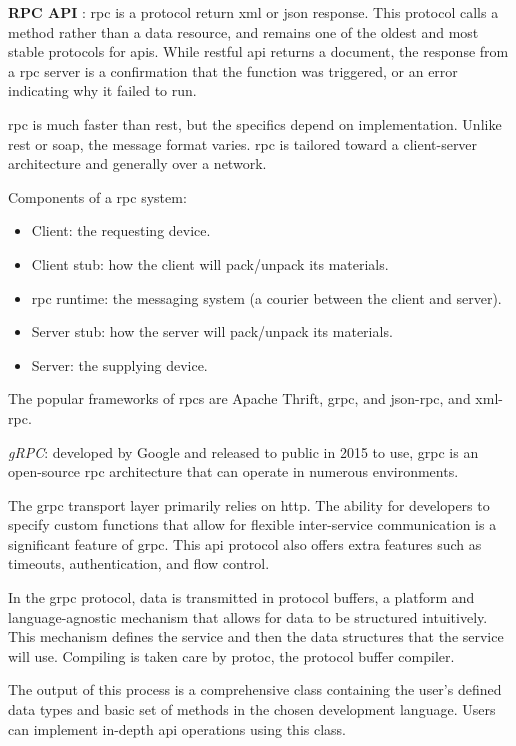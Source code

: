 \begin{multicols}{2} %
    \textbf{RPC API} : \acrshort{rpc} is a protocol return \acrshort{xml} or \acrshort{json} response. This protocol
    calls a method rather than a data resource, and remains one of the oldest and most stable protocols for
    \acrshort{api}s. While \acrshort{rest}ful \acrshort{api} returns a document, the response from a \acrshort{rpc}
    server is a confirmation that the function was triggered, or an error indicating  why it failed to run.

    \acrshort{rpc} is much faster than \acrshort{rest}, but the specifics depend on implementation. Unlike
    \acrshort{rest} or \acrshort{soap}, the message format varies. \acrshort{rpc} is tailored toward a client-server
    architecture and generally over a network.

    Components of a \acrshort{rpc} system:
    \begin{itemize}[label=$\star$]
        \item Client: the requesting device.
        \item Client stub: how the client will pack/unpack its materials.
        \item \acrshort{rpc} runtime: the messaging system (a courier between the client and server).
        \item Server stub: how the server will pack/unpack its materials.
        \item Server: the supplying device.
    \end{itemize}

    The popular frameworks of \acrshort{rpc}s are Apache Thrift, \acrshort{grpc}, and \acrshort{json}-\acrshort{rpc},
    and \acrshort{xml}-\acrshort{rpc}.

    \textit{gRPC}: developed by Google and released to public in 2015 to use, \acrshort{grpc} is an open-source
    \acrshort{rpc} architecture that can operate in numerous environments.

    The \acrshort{grpc} transport layer primarily relies on \acrshort{http}. The ability for developers to specify
    custom functions that allow for flexible inter-service communication is a significant feature of \acrshort{grpc}.
    This \acrshort{api} protocol also offers extra features such as timeouts, authentication, and flow control.

    In the \acrshort{grpc} protocol, data is transmitted in protocol buffers, a platform and language-agnostic mechanism
    that allows for data to be structured intuitively. This mechanism defines the service and then the data structures
    that the service will use. Compiling is taken care by protoc, the protocol buffer compiler.

    The output of this process is a comprehensive class containing the user's defined data types and basic set of methods
    in the chosen development language. Users can implement in-depth \acrshort{api} operations using this class.
\end{multicols}

